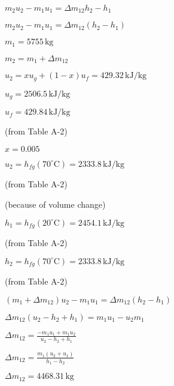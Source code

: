 \( m_2 u_2 - m_1 u_1 = \Delta m_{12} h_2 - h_1 \)  

\( m_2 u_2 - m_1 u_1 = \Delta m_{12} (h_2 - h_1) \)  

\( m_1 = 5755 \, \text{kg} \)  

\( m_2 = m_1 + \Delta m_{12} \)  

\( u_2 = x u_g + (1 - x) u_f = 429.32 \, \text{kJ/kg} \)  

\( u_g = 2506.5 \, \text{kJ/kg} \)  

\( u_f = 429.84 \, \text{kJ/kg} \)  

(from Table A-2)  

\( x = 0.005 \)  

\( u_2 = h_{fg}(70^\circ \text{C}) = 2333.8 \, \text{kJ/kg} \)  

(from Table A-2)  

(because of volume change)  

\( h_1 = h_{fg}(20^\circ \text{C}) = 2454.1 \, \text{kJ/kg} \)  

(from Table A-2)  

\( h_2 = h_{fg}(70^\circ \text{C}) = 2333.8 \, \text{kJ/kg} \)  

(from Table A-2)  

\( (m_1 + \Delta m_{12}) u_2 - m_1 u_1 = \Delta m_{12} (h_2 - h_1) \)  

\( \Delta m_{12} (u_2 - h_2 + h_1) = m_1 u_1 - u_2 m_1 \)  

\( \Delta m_{12} = \frac{-m_1 u_1 + m_1 u_2}{u_2 - h_2 + h_1} \)  

\( \Delta m_{12} = \frac{m_1 (u_2 + u_1)}{h_1 - h_2} \)  

\( \Delta m_{12} = 4468.31 \, \text{kg} \)